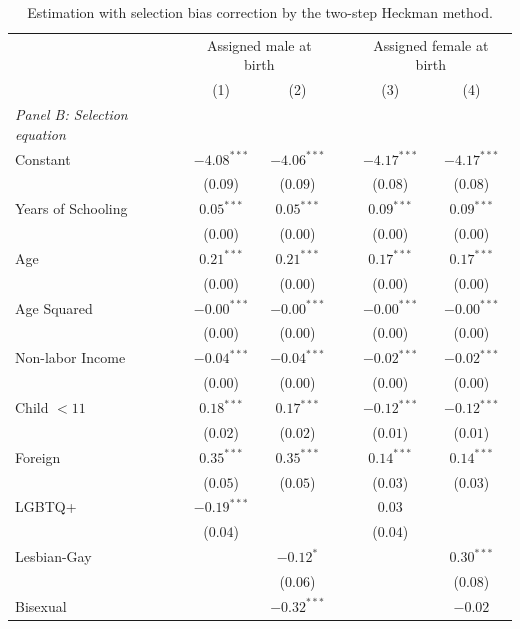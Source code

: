 \begin{table}[H]
\begin{center}
\begin{threeparttable}
\captionsetup{margin=0.5cm}
\caption{Estimation with selection bias correction by the two-step Heckman method.}
\label{AT1_panelB}
\footnotesize
\centering
\begin{tabular}{lccccc}
\toprule
 & \multicolumn{2}{c}{Assigned male at birth} & & \multicolumn{2}{c}{Assigned female at birth} \\ 
 & (1) & (2) & & (3) & (4) \\ \midrule
\textit{Panel B: Selection equation} &  & &  &  &  \\ 
Constant & $-4.08^{***}$& $-4.06^{***}$ & & $-4.17^{***}$& $-4.17^{***}$ \\ 
 & ($0.09$)& ($0.09$) & & ($0.08$)& ($0.08$) \\ 
Years of Schooling & $0.05^{***}$& $0.05^{***}$ & & $0.09^{***}$& $0.09^{***}$ \\ 
 & ($0.00$)& ($0.00$) & & ($0.00$)& ($0.00$) \\ 
Age & $0.21^{***}$& $0.21^{***}$ & & $0.17^{***}$& $0.17^{***}$ \\ 
 & ($0.00$)& ($0.00$) & & ($0.00$)& ($0.00$) \\ 
Age Squared & $-0.00^{***}$& $-0.00^{***}$ & & $-0.00^{***}$& $-0.00^{***}$ \\ 
 & ($0.00$)& ($0.00$) & & ($0.00$)& ($0.00$) \\ 
Non-labor Income & $-0.04^{***}$& $-0.04^{***}$ & & $-0.02^{***}$& $-0.02^{***}$ \\ 
 & ($0.00$)& ($0.00$) & & ($0.00$)& ($0.00$) \\ 
Child $< 11$ & $0.18^{***}$& $0.17^{***}$ & & $-0.12^{***}$& $-0.12^{***}$ \\ 
 & ($0.02$)& ($0.02$) & & ($0.01$)& ($0.01$) \\ 
Foreign & $0.35^{***}$& $0.35^{***}$ & & $0.14^{***}$& $0.14^{***}$ \\ 
 & ($0.05$)& ($0.05$) & & ($0.03$)& ($0.03$) \\ 
LGBTQ+ & $-0.19^{***}$&  & & $0.03$&  \\ 
 & ($0.04$)&  & & ($0.04$)&  \\ 
Lesbian-Gay & & $-0.12^{*}$ & & & $0.30^{***}$ \\ 
 & & ($0.06$) & & & ($0.08$) \\ 
Bisexual & & $-0.32^{***}$ & & & $-0.02$ \\ 

\end{tabular}
\end{threeparttable}
\end{center}
\end{table}
